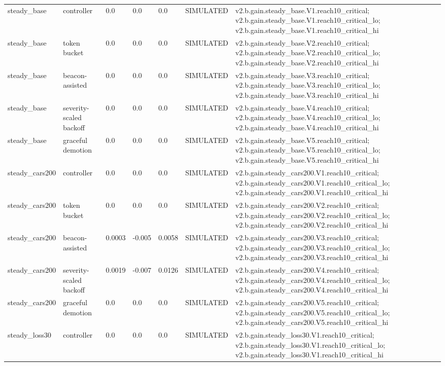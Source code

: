 \begin{table}[t]
\begin{tabular}{lllllll}
steady\_base & controller & 0.0 & 0.0 & 0.0 & SIMULATED & v2.b.gain.steady\_base.V1.reach10\_critical; v2.b.gain.steady\_base.V1.reach10\_critical\_lo; v2.b.gain.steady\_base.V1.reach10\_critical\_hi \\
steady\_base & token bucket & 0.0 & 0.0 & 0.0 & SIMULATED & v2.b.gain.steady\_base.V2.reach10\_critical; v2.b.gain.steady\_base.V2.reach10\_critical\_lo; v2.b.gain.steady\_base.V2.reach10\_critical\_hi \\
steady\_base & beacon-assisted & 0.0 & 0.0 & 0.0 & SIMULATED & v2.b.gain.steady\_base.V3.reach10\_critical; v2.b.gain.steady\_base.V3.reach10\_critical\_lo; v2.b.gain.steady\_base.V3.reach10\_critical\_hi \\
steady\_base & severity-scaled backoff & 0.0 & 0.0 & 0.0 & SIMULATED & v2.b.gain.steady\_base.V4.reach10\_critical; v2.b.gain.steady\_base.V4.reach10\_critical\_lo; v2.b.gain.steady\_base.V4.reach10\_critical\_hi \\
steady\_base & graceful demotion & 0.0 & 0.0 & 0.0 & SIMULATED & v2.b.gain.steady\_base.V5.reach10\_critical; v2.b.gain.steady\_base.V5.reach10\_critical\_lo; v2.b.gain.steady\_base.V5.reach10\_critical\_hi \\
steady\_cars200 & controller & 0.0 & 0.0 & 0.0 & SIMULATED & v2.b.gain.steady\_cars200.V1.reach10\_critical; v2.b.gain.steady\_cars200.V1.reach10\_critical\_lo; v2.b.gain.steady\_cars200.V1.reach10\_critical\_hi \\
steady\_cars200 & token bucket & 0.0 & 0.0 & 0.0 & SIMULATED & v2.b.gain.steady\_cars200.V2.reach10\_critical; v2.b.gain.steady\_cars200.V2.reach10\_critical\_lo; v2.b.gain.steady\_cars200.V2.reach10\_critical\_hi \\
steady\_cars200 & beacon-assisted & 0.0003 & -0.005 & 0.0058 & SIMULATED & v2.b.gain.steady\_cars200.V3.reach10\_critical; v2.b.gain.steady\_cars200.V3.reach10\_critical\_lo; v2.b.gain.steady\_cars200.V3.reach10\_critical\_hi \\
steady\_cars200 & severity-scaled backoff & 0.0019 & -0.007 & 0.0126 & SIMULATED & v2.b.gain.steady\_cars200.V4.reach10\_critical; v2.b.gain.steady\_cars200.V4.reach10\_critical\_lo; v2.b.gain.steady\_cars200.V4.reach10\_critical\_hi \\
steady\_cars200 & graceful demotion & 0.0 & 0.0 & 0.0 & SIMULATED & v2.b.gain.steady\_cars200.V5.reach10\_critical; v2.b.gain.steady\_cars200.V5.reach10\_critical\_lo; v2.b.gain.steady\_cars200.V5.reach10\_critical\_hi \\
steady\_loss30 & controller & 0.0 & 0.0 & 0.0 & SIMULATED & v2.b.gain.steady\_loss30.V1.reach10\_critical; v2.b.gain.steady\_loss30.V1.reach10\_critical\_lo; v2.b.gain.steady\_loss30.V1.reach10\_critical\_hi \\

\end{tabular}
\end{table}

